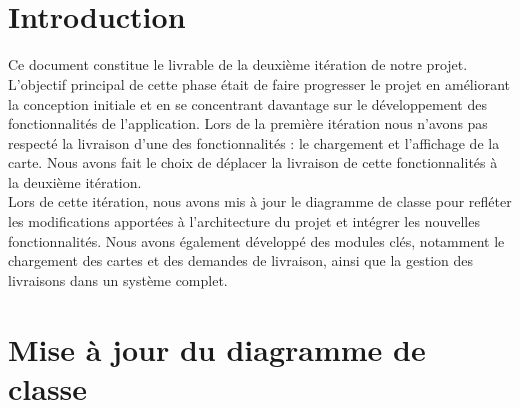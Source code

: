 \documentclass[a4paper]{article}
\begin{document}
\newcommand{\HRule}{\rule{\linewidth}{0.5mm}}



~
\thispagestyle{empty}

\tableofcontents
\thispagestyle{empty}
\setcounter{page}{0}

\renewcommand{\arraystretch}{1.5}


~
\thispagestyle{empty}
\setcounter{page}{0}

\section*{Introduction} \label{ch1}
Ce document constitue le livrable de la deuxième itération de notre projet. L’objectif principal de cette phase était de faire progresser le projet en améliorant la conception initiale et en se concentrant davantage sur le développement des fonctionnalités de l’application. Lors de la première itération nous n'avons pas respecté la livraison d'une des fonctionnalités : le chargement et l'affichage de la carte. Nous avons fait le choix de déplacer la livraison de cette fonctionnalités à la deuxième itération. \\
\newline
\indent Lors de cette itération, nous avons mis à jour le diagramme de classe pour refléter les modifications apportées à l’architecture du projet et intégrer les nouvelles fonctionnalités. Nous avons également développé des modules clés, notamment le chargement des cartes et des demandes de livraison, ainsi que la gestion des livraisons dans un système complet.

\section{Mise à jour du diagramme de classe}
\end{document}

